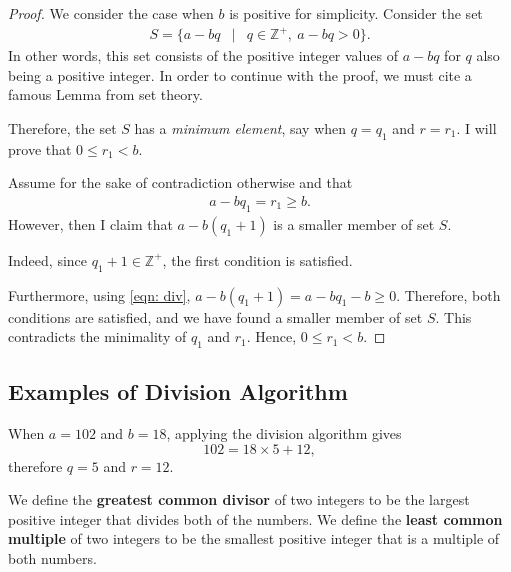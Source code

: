 \begin{proof}

We consider the case when $b$ is positive for simplicity.  Consider the set \begin{eqnarray*} S=\{a-bq &|& q \in \mathbb{Z}^{+},\:a-bq>0\}. \end{eqnarray*}  
In other words, this set consists of the positive integer values of $a-bq$ for $q$ also being a positive integer.  In order to continue with the proof, we must cite a famous Lemma from set theory.  \cite{me:1} 


\clearpage

Therefore, the set $S$ has a \textit{minimum element}, say when $q=q_1$ and $r=r_1$. I will prove that $0\le r_1<b.$  

Assume for the sake of contradiction otherwise and that \begin{eqnarray} a-bq_1=r_1\ge b. \label{eqn: div} \end{eqnarray} However, then I claim that $a-b(q_1+1)$ is a smaller member of set $S$. 

Indeed, since $q_1+1\in \mathbb{Z}^{+}$, the first condition is satisfied.

Furthermore, using \ref{eqn: div}, $a-b(q_1+1)=a-bq_1-b\ge 0$. Therefore, both conditions are satisfied, and we have found a smaller member of set $S$. This contradicts the minimality of $q_1$ and $r_1$.  Hence, $0\le r_1<b$.   \end{proof}

\clearpage

\subsection*{Examples of Division Algorithm}

When $a=102$ and $b=18$, applying the division algorithm gives $$102=18\times 5+12,$$ therefore $q=5$ and $r=12$. 

\clearpage


\begin{defi}  We define the \textbf{greatest common divisor} of two integers to be the largest positive integer that divides both of the numbers. We define the \textbf{least common multiple} of two integers to be the smallest positive integer that is a multiple of both numbers.  \end{defi}

